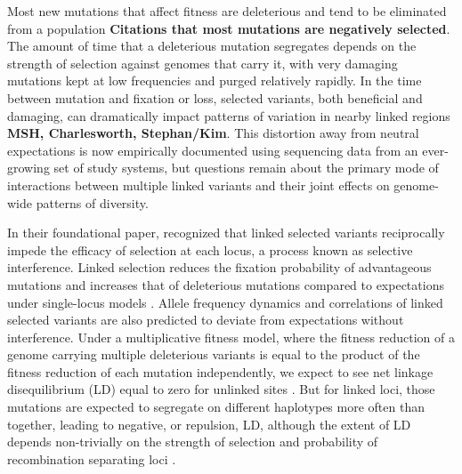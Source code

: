 \documentclass[]{article}
\begin{document}
Most new mutations that affect fitness are deleterious and tend to be
eliminated from a population
\textbf{Citations that most mutations are negatively selected}.
The amount of time that a
deleterious mutation segregates depends on the strength of selection against
genomes that carry it, with very damaging mutations kept at low frequencies and
purged relatively rapidly. In the time between mutation and fixation or loss,
selected variants, both beneficial and damaging, can dramatically impact
patterns of variation in nearby linked regions \textbf{MSH, Charlesworth, Stephan/Kim}.
This distortion away from neutral expectations is now empirically documented using
sequencing data from an ever-growing set of study systems, but questions remain
about the primary mode of interactions between multiple linked variants and
their joint effects on genome-wide patterns of diversity.

In their foundational paper, \citet{Hill1966-gv} recognized that linked
selected variants reciprocally impede the efficacy of selection at each locus,
a process known as selective interference. Linked selection reduces the
fixation probability of advantageous mutations and increases that of
deleterious mutations compared to expectations under single-locus models
\citep{Birky1988-jm}. Allele frequency dynamics and correlations of linked
selected variants are also predicted to deviate from expectations without
interference. Under a multiplicative fitness model, where the fitness reduction
of a genome carrying multiple deleterious variants is equal to the product of
the fitness reduction of each mutation independently, we expect to see net
linkage disequilibrium (LD) equal to zero for unlinked sites
\citep{Kondrashov1995-va}. But for linked loci, those mutations are expected to
segregate on different haplotypes more often than together, leading to
negative, or repulsion, LD, although the extent of LD depends non-trivially on
the strength of selection and probability of recombination separating loci
\citep{Hill1966-gv, McVean2000-ox}.
\end{document}
